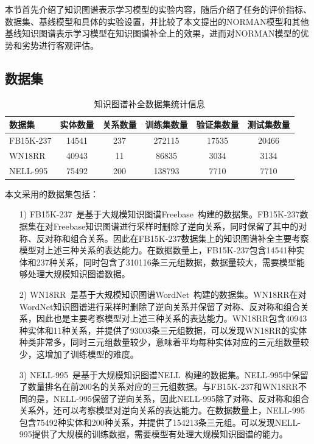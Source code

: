 \documentclass[algorithmlist, AutoFakeBold, AutoFakeSlant, figurelist, tablelist, nomlist, engineering, openany]{seuthesix} %
\begin{document}
本节首先介绍了知识图谱表示学习模型的实验内容，随后介绍了任务的评价指标、数据集、基线模型和具体的实验设置，并比较了本文提出的NORMAN模型和其他基线知识图谱表示学习模型在知识图谱补全上的效果，进而对NORMAN模型的优势和劣势进行客观评估。

\subsection{数据集}
\begin{table}[t]
  \centering
  \caption{知识图谱补全数据集统计信息}
  \begin{tabular*}{0.95\textwidth}{@{\extracolsep{\fill}}lccccc}
    \toprule[1pt]
    数据集 & 实体数量 & 关系数量 & 训练集数量 & 验证集数量 & 测试集数量 \\ \hline
    FB15K-237 & 14541 & 237 & 272115 & 17535 & 20466\\
    WN18RR & 40943 & 11 & 86835 & 3034 & 3134\\
    NELL-995 & 75492 & 200 & 138793 & 7710 & 7710\\
    \bottomrule[1pt]
	\end{tabular*}
  \label{Datasets1}
\end{table}

本文采用的数据集包括：
\begin{itemize}
  \item [1)]FB15K-237~\cite{toutanova2015representing}是基于大规模知识图谱Freebase~\cite{bollacker2008freebase}构建的数据集。FB15K-237数据集在对Freebase知识图谱进行采样时删除了逆向关系，同时保留了其中的对称、反对称和组合关系。因此在FB15K-237数据集上的知识图谱补全主要考察模型对上述三种关系的表达能力。在数据数量上，FB15K-237包含14541种实体和237种关系，同时包含了310116条三元组数据，数据量较大，需要模型能够处理大规模知识图谱数据。
  \item [2)]WN18RR~\cite{dettmers2018convolutional}是基于大规模知识图谱WordNet~\cite{glorot2010understanding}构建的数据集。WN18RR在对WordNet知识图谱进行采样时删除了逆向关系并保留了对称、反对称和组合关系，因此也是主要考察模型对上述三种关系的表达能力。WN18RR包含40943种实体和11种关系，并提供了93003条三元组数据，可以发现WN18RR的实体种类非常多，同时三元组数量较少，意味着平均每种实体对应的三元组数量较少，这增加了训练模型的难度。
  \item [3)]NELL-995~\cite{xiong2017deeppath}是基于大规模知识图谱NELL~\cite{carlson2010toward}构建的数据集。NELL-995中保留了数量排名在前200名的关系对应的三元组数据。与FB15K-237和WN18RR不同的是，NELL-995保留了逆向关系，因此NELL-995除了对称、反对称和组合关系外，还可以考察模型对逆向关系的表达能力。在数据数量上，NELL-995包含75492种实体和200种关系，并提供了154213条三元组。可以发现NELL-995提供了大规模的训练数据，需要模型有处理大规模知识图谱的能力。
\end{itemize}
\end{document}
